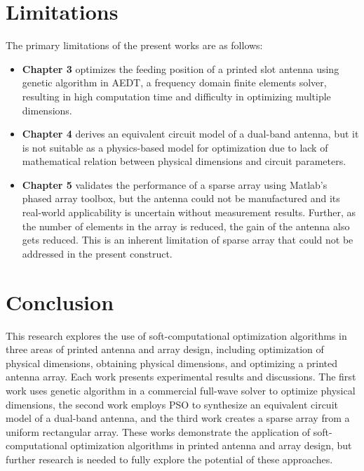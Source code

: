 \documentclass[]{ectguthesis}
\begin{document}
\section{Limitations}\label{c6sec_limitations}
The primary limitations of the present works are as follows:
\begin{itemize}
\item \textbf{Chapter 3} optimizes the feeding position of a printed slot antenna using genetic algorithm in AEDT, a frequency domain finite elements solver, resulting in high computation time and difficulty in optimizing multiple dimensions.
\item \textbf{Chapter 4} derives an equivalent circuit model of a dual-band antenna, but it is not suitable as a physics-based model for optimization due to lack of mathematical relation between physical dimensions and circuit parameters.
\item \textbf{Chapter 5} validates the performance of a sparse array using Matlab's phased array toolbox, but the antenna could not be manufactured and its real-world applicability is uncertain without measurement results. Further, as the number of elements in the array is reduced, the gain of the antenna also gets reduced. This is an inherent limitation of sparse array that could not be addressed in the present construct.
\end{itemize}

\section{Conclusion}\label{c6sec_cncl}
This research explores the use of soft-computational optimization algorithms in three areas of printed antenna and array design, including optimization of physical dimensions, obtaining physical dimensions, and optimizing a printed antenna array. Each work presents experimental results and discussions. The first work uses genetic algorithm in a commercial full-wave solver to optimize physical dimensions, the second work employs PSO to synthesize an equivalent circuit model of a dual-band antenna, and the third work creates a sparse array from a uniform rectangular array. These works demonstrate the application of soft-computational optimization algorithms in printed antenna and array design, but further research is needed to fully explore the potential of these approaches.
\end{document}
